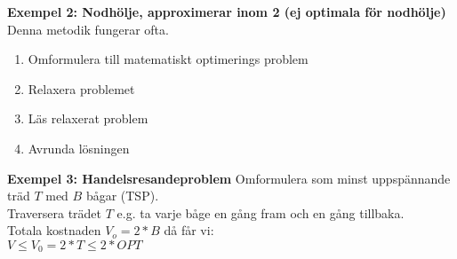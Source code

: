 \textbf{Exempel 2: Nodhölje, approximerar inom 2 (ej optimala för nodhölje)}
Denna metodik fungerar ofta.
\begin{enumerate}
\item Omformulera till matematiskt optimerings problem
\item Relaxera problemet
\item Läs relaxerat problem
\item Avrunda lösningen
\end{enumerate}

\textbf{Exempel 3: Handelsresandeproblem}
Omformulera som minst uppspännande träd $T$ med $B$ bågar (TSP). \\
Traversera trädet $T$ e.g. ta varje båge en gång fram och en gång tillbaka. \\
Totala kostnaden $V_o = 2 * B$ då får vi: \\
\(V \leq V_0 = 2 * T \leq 2 * OPT\)
\begin{itemize}

  
\end{itemize}